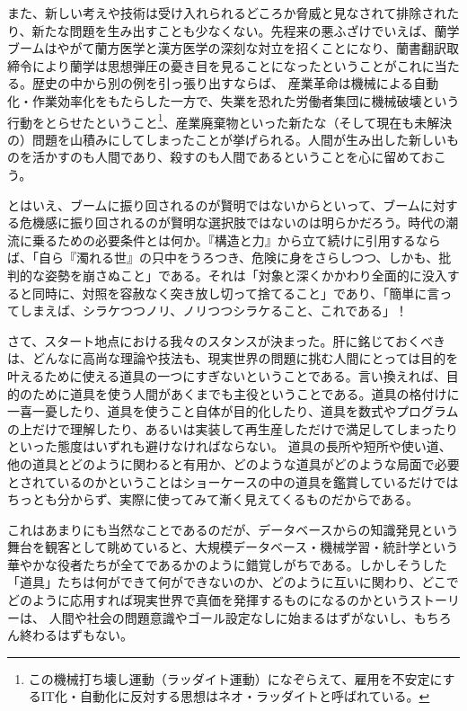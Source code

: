 また、新しい考えや技術は受け入れられるどころか脅威と見なされて排除されたり、新たな問題を生み出すことも少なくない。先程来の悪ふざけでいえば、蘭学ブームはやがて蘭方医学と漢方医学の深刻な対立を招くことになり、蘭書翻訳取締令により蘭学は思想弾圧の憂き目を見ることになったということがこれに当たる。歴史の中から別の例を引っ張り出すならば、
産業革命は機械による自動化・作業効率化をもたらした一方で、失業を恐れた労働者集団に機械破壊という行動をとらせたということ\footnote{この機械打ち壊し運動（ラッダイト運動）になぞらえて、雇用を不安定にするIT化・自動化に反対する思想はネオ・ラッダイトと呼ばれている。}、産業廃棄物といった新たな（そして現在も未解決の）問題を山積みにしてしまったことが挙げられる。人間が生み出した新しいものを活かすのも人間であり、殺すのも人間であるということを心に留めておこう。

とはいえ、ブームに振り回されるのが賢明ではないからといって、ブームに対する危機感に振り回されるのが賢明な選択肢ではないのは明らかだろう。時代の潮流に乗るための必要条件とは何か。『構造と力』から立て続けに引用するならば、「自ら『濁れる世』の只中をうろつき、危険に身をさらしつつ、しかも、批判的な姿勢を崩さぬこと」である。それは「対象と深くかかわり全面的に没入すると同時に、対照を容赦なく突き放し切って捨てること」であり、「簡単に言ってしまえば、シラケつつノリ、ノリつつシラケること、これである」！

さて、スタート地点における我々のスタンスが決まった。肝に銘じておくべきは、どんなに高尚な理論や技法も、現実世界の問題に挑む人間にとっては目的を叶えるために使える道具の一つにすぎないということである。言い換えれば、目的のために道具を使う人間があくまでも主役ということである。道具の格付けに一喜一憂したり、道具を使うこと自体が目的化したり、道具を数式やプログラムの上だけで理解したり、あるいは実装して再生産しただけで満足してしまったりといった態度はいずれも避けなければならない。
道具の長所や短所や使い道、他の道具とどのように関わると有用か、どのような道具がどのような局面で必要とされているのかということはショーケースの中の道具を鑑賞しているだけではちっとも分からず、実際に使ってみて漸く見えてくるものだからである。

これはあまりにも当然なことであるのだが、データベースからの知識発見という舞台を観客として眺めていると、大規模データベース・機械学習・統計学という華やかな役者たちが全てであるかのように錯覚しがちである。しかしそうした「道具」たちは何ができて何ができないのか、どのように互いに関わり、どこでどのように応用すれば現実世界で真価を発揮するものになるのかというストーリーは、
人間や社会の問題意識やゴール設定なしに始まるはずがないし、もちろん終わるはずもない。

